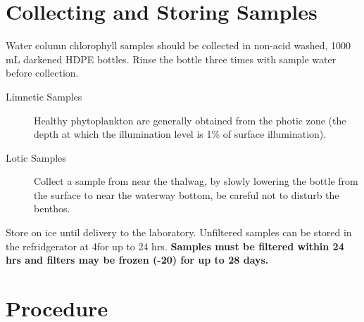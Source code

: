 \documentclass[12pt]{../SOP2}
\begin{document}
\section{Collecting and Storing Samples}

\NP Water column chlorophyll samples should be collected in non-acid washed, 1000 mL darkened HDPE bottles. Rinse the bottle three times with sample water before collection. 

\begin{description}
  \item[Limnetic Samples] Healthy phytoplankton are generally obtained from the photic zone (the depth at which the illumination level is 1\% of surface illumination). 
  \item[Lotic Samples] Collect a sample from near the thalwag, by slowly lowering the bottle from the surface to near the waterway bottom, be careful not to disturb the benthos. 
\end{description}


\NP Store on ice until delivery to the laboratory. Unfiltered samples can be stored in the refridgerator at 4\celsius for up to 24 hrs. \textbf{Samples must be filtered within 24 hrs and filters may be frozen (-20\celsius) for up to 28 days.}


\section{Procedure}
\end{document}

